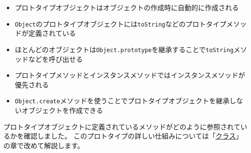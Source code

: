 \begin{itemize}
\item
  プロトタイプオブジェクトはオブジェクトの作成時に自動的に作成される
\item
  \texttt{Object}のプロトタイプオブジェクトには\texttt{toString}などのプロトタイプメソッドが定義されている
\item
  ほとんどのオブジェクトは\texttt{Object.prototype}を継承することで\texttt{toString}メソッドなどを呼び出せる
\item
  プロトタイプメソッドとインスタンスメソッドではインスタンスメソッドが優先される
\item
  \texttt{Object.create}メソッドを使うことでプロトタイプオブジェクトを継承しないオブジェクトを作成できる
\end{itemize}

プロトタイプオブジェクトに定義されているメソッドがどのように参照されているかを確認しました。
このプロトタイプの詳しい仕組みについては「\hyperlink{class}{クラス}」の章で改めて解説します。
